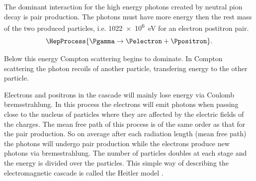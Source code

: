The dominant interaction for the high energy photons created by neutral pion decay is pair production. The photons must have more energy then the rest mass of the two produced particles, i.e. \SI{1022e6}{\eV} for an electron postitron pair.
%
\begin{equation}
    \HepProcess{\Pgamma \to \Pelectron + \Ppositron}.
\end{equation}

Below this energy Compton scattering begins to dominate. In Compton scattering the photon recoils of another particle, transfering energy to the other particle.

Electrons and positrons in the cascade will mainly lose energy via Coulomb bremsstrahlung. In this process the electrons will emit photons when passing close to the nucleus of particles where they are affected by the electric fields of the charges. The mean free path of this process is of the same order as that for the pair production. So on average after each radiation length (mean free path) the photons will undergo pair production while the electrons produce new photons via bremsstrahlung. The number of particles doubles at each stage and the energy is divided over the particles. This simple way of describing the electromagnetic cascade is called the Heitler model \cite{matthews2005heitler}.

